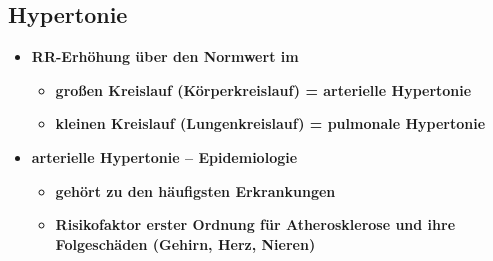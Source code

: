 	\subsection{Hypertonie}
		\begin{itemize}
			\item \textbf{RR-Erhöhung über den Normwert im}
				\begin{itemize}
					\item \textbf{großen Kreislauf (Körperkreislauf) = arterielle Hypertonie}
					\item \textbf{kleinen Kreislauf (Lungenkreislauf) = pulmonale Hypertonie}
				\end{itemize}
			\item \textbf{arterielle Hypertonie – Epidemiologie}
				\begin{itemize}
					\item \textbf{gehört zu den häufigsten Erkrankungen}
					\item \textbf{Risikofaktor erster Ordnung für Atherosklerose und ihre Folgeschäden (Gehirn, Herz, Nieren)}
				\end{itemize}
		\end{itemize}
